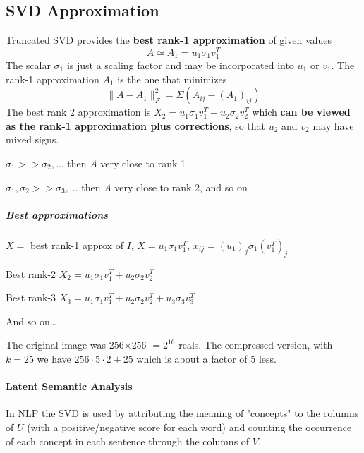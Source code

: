 \documentclass[10pt]{report}
\begin{document}
\subsection{SVD Approximation}
Truncated SVD provides the \textbf{best rank-1 approximation} of given values $$A\simeq A_1 = u_1\sigma_1v_1^T$$
The scalar $\sigma_1$ is just a scaling factor and may be incorporated into $u_1$ or $v_1$. The rank-1 approximation $A_1$ is the one that minimizes
$$\|A-A_1\|_F^2 = \Sigma(A_{ij}-(A_1)_{ij})$$
The best rank 2 approximation is $X_2 = u_1\sigma_1 v_1^T + u_2\sigma_2 v_2^T$ which \textbf{can be viewed as the rank-1 approximation plus corrections}, so that $u_2$ and $v_2$ may have mixed signs.
\begin{list}{}{}
	\item $\sigma_1 >> \sigma_2,\ldots$ then $A$ very close to rank 1
	\item $\sigma_1, \sigma_2 >> \sigma_3,\ldots$ then $A$ very close to rank 2, and so on
\end{list}
\subparagraph{Best approximations} 
\begin{list}{}{}
	\item $X =$ best rank-1 approx of $I$, $X = u_1\sigma_1 v_1^T$, $x_{ij} = (u_1)_j \sigma_1 (v_1^T)_j$
	\item Best rank-2 $X_2 = u_1\sigma_1 v_1^T + u_2 \sigma_2 v_2^T$
	\item Best rank-3 $X_3 = u_1\sigma_1 v_1^T + u_2 \sigma_2 v_2^T + u_3 \sigma_3 v_3^T$
	\item And so on\ldots
\end{list}
The original image was 256$\times$256 $= 2^{16}$ reals. The compressed version, with $k = 25$ we have $256\cdot5\cdot2 + 25$ which is about a factor of 5 less.
\paragraph{Latent Semantic Analysis} In NLP the SVD is used by attributing the meaning of "concepts" to the columns of $U$ (with a positive/negative score for each word) and counting the occurrence of each concept in each sentence through the columns of $V$.
\end{document}
